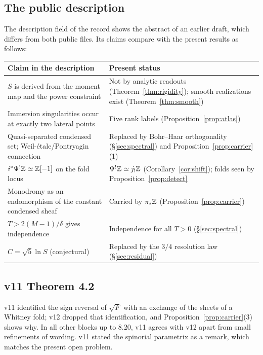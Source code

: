 \documentclass[11pt]{article}
\theoremstyle{definition}\newtheorem{definition}[theorem]{Definition}
\theoremstyle{remark}\newtheorem{remark}[theorem]{Remark}
\begin{document}
\subsection{The public description}
The description field of the record \cite{record} shows the abstract of an
earlier draft, which differs from both public files. Its claims compare with
the present results as follows:
\begin{center}\small
\begin{tabular}{>{\raggedright\arraybackslash}p{.40\linewidth}>{\raggedright\arraybackslash}p{.52\linewidth}}\toprule
Claim in the description & Present status\\\midrule
$S$ is derived from the moment map and the power constraint & Not by analytic readouts (Theorem~\ref{thm:rigidity}); smooth realizations exist (Theorem~\ref{thm:smooth})\\
Immersion singularities occur at exactly two lateral points & Five rank labels (Proposition~\ref{prop:atlas})\\
Quasi-separated condensed set; Weil-étale/Pontryagin connection & Replaced by Bohr--Haar orthogonality (\S\ref{sec:spectral}) and Proposition~\ref{prop:carrier}(1)\\
$i^*\Psi^!\mathbb Z\simeq\mathbb Z[-1]$ on the fold locus & $\Psi^!\mathbb Z\simeq j_!\mathbb Z$ (Corollary~\ref{cor:shift}); folds seen by Proposition~\ref{prop:detect}\\
Monodromy as an endomorphism of the constant condensed sheaf & Carried by $\pi_*\mathbb Z$ (Proposition~\ref{prop:carrier})\\
$T>2(M-1)/\delta$ gives independence & Independence for all $T>0$ (\S\ref{sec:spectral})\\
$C=\sqrt5\ln S$ (conjectural) & Replaced by the $3/4$ resolution law (\S\ref{sec:residual})\\\bottomrule
\end{tabular}
\end{center}

\subsection{v11 Theorem 4.2}
v11 identified the sign reversal of $\sqrt F$ with an exchange of the sheets of
a Whitney fold; v12 dropped that identification, and
Proposition~\ref{prop:carrier}(3) shows why. In all other blocks up to 8.20,
v11 agrees with v12 apart from small refinements of wording. v11 stated the
spinorial parametrix as a remark, which matches the present open problem.
\end{document}
